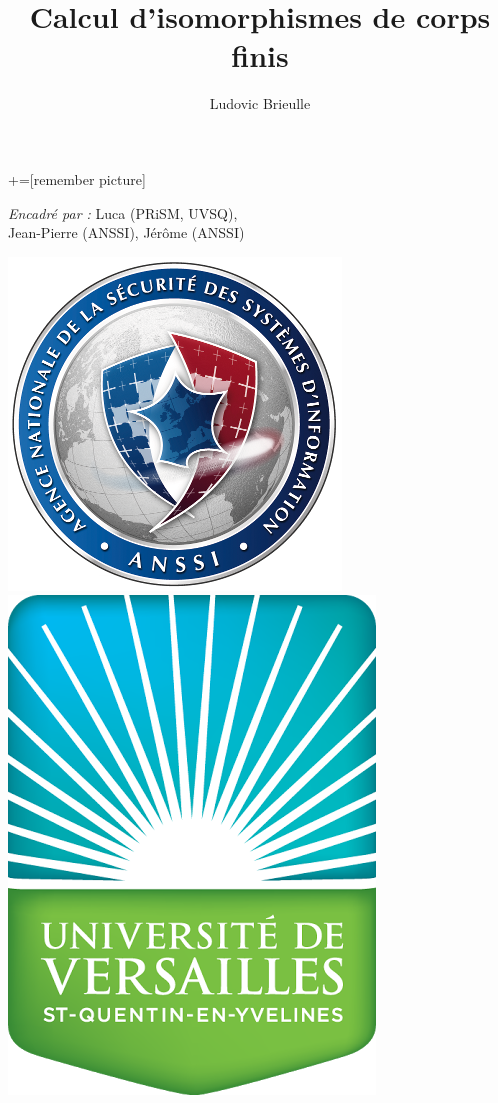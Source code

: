 \documentclass{beamer} %
\numberwithin{equation}{section}
\begin{document}
\title{Calcul d'isomorphismes de corps finis}
\author{Ludovic Brieulle}
\newtheorem*{thm}{Théorème}
\newtheorem{lem}{Lemme}
\newtheorem{cor}{Corollaire}
\newtheorem{prop}{Proposition}
\theoremstyle{definition}
\newtheorem{defn}{Définition}
\newtheorem*{ex}{Exemple}
\theoremstyle{remark}
\newtheorem*{rem}{Remarque}
\newtheorem*{conj}{Observation}
+=[remember picture]
\everymath{\displaystyle}





\begin{frame}
\begin{titlepage}
\emph{Encadré par :}
Luca  (PRiSM, UVSQ),\\ %
Jean-Pierre  (ANSSI), %
Jérôme  (ANSSI)%
\begin{center}
\includegraphics[scale=0.3]{Anssi}
\hspace{3cm}
\includegraphics[scale=0.2]{UVSQ}
\end{center}
\end{titlepage}
\end{frame}
\end{document}
